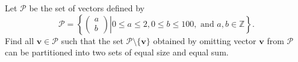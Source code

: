 Let $\mathcal{P}$ be the set of vectors defined by
\[
\mathcal{P} = \left\{ \left. \begin{pmatrix} a \\ b \end{pmatrix} \right| 0 \leq a \leq 2, 0 \leq b \leq 100, \mbox{ and } a,b \in \mathbb{Z} \right\}.
\]
Find all $\mathbf{v} \in \mathcal{P}$ such that the set $\mathcal{P} \setminus \{ \mathbf{v} \}$ obtained by omitting
vector $\mathbf{v}$ from $\mathcal{P}$ can be partitioned into two sets of equal size and equal sum. 
